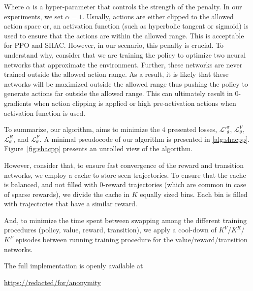     Where $\alpha$ is a hyper-parameter that controls the strength of the penalty. In our experiments, we set $\alpha=1$. Usually, actions are either clipped to the allowed action space or, an activation function (such as hyperbolic tangent or sigmoid) is used to ensure that the actions are within the allowed range. This is acceptable for PPO and SHAC. However, in our scenario, this penalty is crucial. To understand why, consider that we are training the policy to optimize two neural networks that approximate the environment. Further, these networks are never trained outside the allowed action range. As a result, it is likely that these networks will be maximized outside the allowed range thus pushing the policy to generate actions far outside the allowed range. This can ultimately result in 0-gradients when action clipping is applied or high pre-activation actions when activation function is used. 

To summarize, our algorithm, aims to minimize the 4 presented losses, $\mathcal{L'}_\theta^{\pi}$, $\mathcal{L}_\theta^V$, $\mathcal{L}_\theta^R$, and $\mathcal{L}_\theta^F$. A minimal pseudocode of our algorithm is presented in \ref{alg:shacpp}. Figure~\ref{fig:shacpp} presents an unrolled view of the \fname{} algorithm.

However, consider that, to ensure fast convergence of the reward and transition networks, we employ a cache to store seen trajectories. To ensure that the cache is balanced, and not filled with $0$-reward trajectories (which are common in case of sparse rewards), we divide the cache in $K$ equally sized bins. Each bin is filled with trajectories that have a similar reward. 

And, to minimize the time spent between swapping among the different training procedures (policy, value, reward, transition), we apply a cool-down of $K^V$/$K^R$/$K^F$ episodes between running training procedure for the value/reward/transition networks. 

The full implementation is openly available at 
\begin{center}
\url{https://redacted/for/anonymity}
\end{center}

